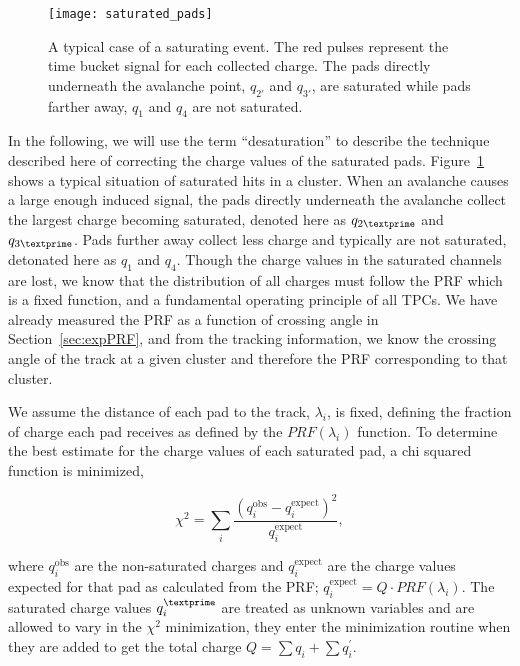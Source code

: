 \begin{figure}[ht!]
\texttt{[image: saturated\_pads]}
\caption{A typical case of a saturating event. The red pulses represent the time bucket signal for each collected charge. The pads directly underneath the avalanche point, $q_{2'}$ and $q_{3'}$, are saturated while pads farther away, $q_1$ and $q_4$ are not saturated.}
\label{fig:satpad}
\end{figure}

In the following, we will use the term ``desaturation'' to describe the technique described here of correcting the charge values of the saturated pads. Figure~\ref{fig:satpad} shows a typical situation of saturated hits in a cluster. When an avalanche causes a large enough induced signal, the pads directly underneath the avalanche collect the largest charge becoming saturated, denoted here as $q_{2\textprime}$ and $q_{3\textprime}$. Pads further away collect less charge and typically are not saturated, detonated here as $q_{1}$ and $q_{4}$. Though the charge values in the saturated channels are lost, we know that the distribution of all charges must follow the PRF which is a fixed function, and a fundamental operating principle of all TPCs. We have already measured the PRF as a function of crossing angle in Section~\ref{sec:expPRF}, and from the tracking information, we know the crossing angle of the track at a given cluster and therefore the PRF corresponding to that cluster. 

We assume the distance of each pad to the track, $\lambda_i$, is fixed, defining the fraction of charge each pad receives as defined by the $PRF(\lambda_i)$ function. To determine the best estimate for the charge values of each saturated pad, a chi squared function is minimized,

\begin{equation}\label{eq:chi}
\chi^2 = \sum_i \frac{(q_i^{\mathrm{obs}} - q_i^{\mathrm{expect}})^2}{q_i^{\mathrm{expect}}},
\end{equation}


where $q_i^{\mathrm{obs}}$ are the non-saturated charges and $q_i^{\mathrm{expect}}$ are the charge values expected for that pad as calculated from the PRF; $q_i^{\mathrm{expect}} = Q\cdot PRF(\lambda_i)$. The saturated charge values $q_{i}^{\textprime}$ are treated as unknown variables and are allowed to vary in the $\chi^2$ minimization, they enter the minimization routine when they are added to get the total charge $Q = \sum q_i + \sum q_i^{'}$. 


